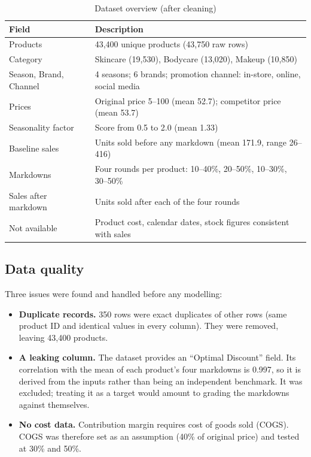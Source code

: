 \documentclass[11pt, a4paper]{article}
\begin{document}
\begin{table}[!htbp]
\centering\small
\caption{Dataset overview (after cleaning)}
\label{tab:data}
\begin{tabularx}{\textwidth}{lX}
\toprule
\textbf{Field} & \textbf{Description} \\
\midrule
Products & 43,400 unique products (43,750 raw rows) \\
Category & Skincare (19,530), Bodycare (13,020), Makeup (10,850) \\
Season, Brand, Channel & 4 seasons; 6 brands; promotion channel: in-store, online, social media \\
Prices & Original price 5--100 (mean 52.7); competitor price (mean 53.7) \\
Seasonality factor & Score from 0.5 to 2.0 (mean 1.33) \\
Baseline sales & Units sold before any markdown (mean 171.9, range 26--416) \\
Markdowns & Four rounds per product: 10--40\%, 20--50\%, 10--30\%, 30--50\% \\
Sales after markdown & Units sold after each of the four rounds \\
Not available & Product cost, calendar dates, stock figures consistent with sales \\
\bottomrule
\end{tabularx}
\end{table}

\subsection{Data quality}
Three issues were found and handled before any modelling:
\begin{itemize}
  \item \textbf{Duplicate records.} 350 rows were exact duplicates of other rows (same product ID and identical values in every column). They were removed, leaving 43,400 products.
  \item \textbf{A leaking column.} The dataset provides an ``Optimal Discount'' field. Its correlation with the mean of each product's four markdowns is 0.997, so it is derived from the inputs rather than being an independent benchmark. It was excluded; treating it as a target would amount to grading the markdowns against themselves.
  \item \textbf{No cost data.} Contribution margin requires cost of goods sold (COGS). COGS was therefore set as an assumption (40\% of original price) and tested at 30\% and 50\%.
\end{itemize}
\end{document}
